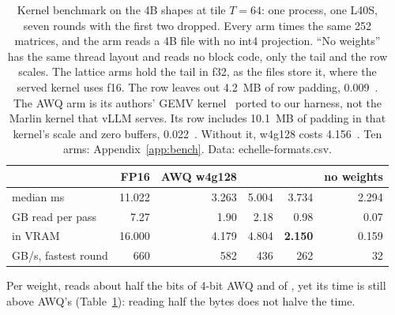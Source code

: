 \begin{table}[t]
\centering\small\setlength{\tabcolsep}{5pt}
\caption{Kernel benchmark on the 4B shapes at tile $T=64$: one process, one
L40S, seven rounds with the first two dropped. Every arm times the same 252
matrices, and the \Tetra{} arm reads a 4B file with no int4 projection. ``No
weights'' has the same thread layout and reads no block code, only the tail
and the row scales. The lattice arms hold the tail in f32, as the files store
it, where the served kernel uses f16. The \Tetra{} row leaves out 4.2~MB of
row padding, 0.009~\bw{}. The AWQ arm is its authors' GEMV
kernel~\citep{awq2024} ported to our harness, not the Marlin kernel that vLLM
serves. Its row includes 10.1~MB of padding in that kernel's scale and zero
buffers, 0.022~\bw{}. Without it, w4g128 costs 4.156~\bw{}. Ten arms:
Appendix~\ref{app:bench}. Data: echelle-formats.csv.}
\label{tab:bench}
\begin{tabular}{lrrrrr}
\toprule
 & FP16 & AWQ w4g128 & \Planes{} & \Tetra{} & no weights\\
\midrule
median ms & 11.022 & 3.263 & 5.004 & 3.734 & 2.294\\
GB read per pass & 7.27 & 1.90 & 2.18 & 0.98 & 0.07\\
\bw{} in VRAM & 16.000 & 4.179 & 4.804 & \textbf{2.150} & 0.159\\
GB/s, fastest round & 660 & 582 & 436 & 262 & 32\\
\bottomrule
\end{tabular}
\end{table}

Per weight, \Tetra{} reads about half the bits of 4-bit AWQ and of \Planes{},
yet its time is still above AWQ's (Table~\ref{tab:bench}): reading half the
bytes does not halve the time.

